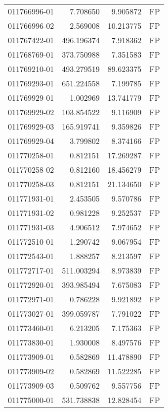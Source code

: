 \begin{tabular}{lrrl}
011766996-01 &    7.708650 &       9.905872 &   FP \\
011766996-02 &    2.569008 &      10.213775 &   FP \\
011767422-01 &  496.196374 &       7.918362 &   FP \\
011768769-01 &  373.750988 &       7.351583 &   FP \\
011769210-01 &  493.279519 &      89.623375 &   FP \\
011769293-01 &  651.224558 &       7.199785 &   FP \\
011769929-01 &    1.002969 &      13.741779 &   FP \\
011769929-02 &  103.854522 &       9.116909 &   FP \\
011769929-03 &  165.919741 &       9.359826 &   FP \\
011769929-04 &    3.799802 &       8.374166 &   FP \\
011770258-01 &    0.812151 &      17.269287 &   FP \\
011770258-02 &    0.812160 &      18.456279 &   FP \\
011770258-03 &    0.812151 &      21.134650 &   FP \\
011771931-01 &    2.453505 &       9.570786 &   FP \\
011771931-02 &    0.981228 &       9.252537 &   FP \\
011771931-03 &    4.906512 &       7.974652 &   FP \\
011772510-01 &    1.290742 &       9.067954 &   FP \\
011772543-01 &    1.888257 &       8.213597 &   FP \\
011772717-01 &  511.003294 &       8.973839 &   FP \\
011772920-01 &  393.985494 &       7.675083 &   FP \\
011772971-01 &    0.786228 &       9.921892 &   FP \\
011773027-01 &  399.059787 &       7.791022 &   FP \\
011773460-01 &    6.213205 &       7.175363 &   FP \\
011773830-01 &    1.930008 &       8.497576 &   FP \\
011773909-01 &    0.582869 &      11.478890 &   FP \\
011773909-02 &    0.582869 &      11.522285 &   FP \\
011773909-03 &    0.509762 &       9.557756 &   FP \\
011775000-01 &  531.738838 &      12.828454 &   FP \\

\end{tabular}
